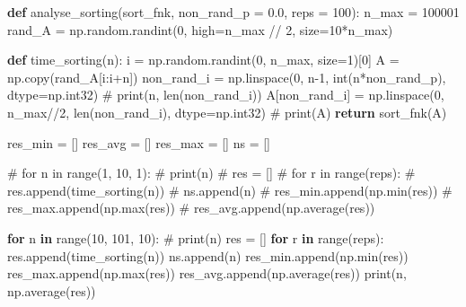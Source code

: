 \documentclass[
  letterpaper,
  DIV=11,
  numbers=noendperiod]{scrreprt}
\newenvironment{Shaded}{\begin{snugshade}}{\end{snugshade}}
\newcommand{\BuiltInTok}[1]{\textcolor[rgb]{0.00,0.23,0.31}{#1}}
\newcommand{\CommentTok}[1]{\textcolor[rgb]{0.37,0.37,0.37}{#1}}
\newcommand{\ControlFlowTok}[1]{\textcolor[rgb]{0.00,0.23,0.31}{\textbf{#1}}}
\newcommand{\DecValTok}[1]{\textcolor[rgb]{0.68,0.00,0.00}{#1}}
\newcommand{\FloatTok}[1]{\textcolor[rgb]{0.68,0.00,0.00}{#1}}
\newcommand{\KeywordTok}[1]{\textcolor[rgb]{0.00,0.23,0.31}{\textbf{#1}}}
\newcommand{\NormalTok}[1]{\textcolor[rgb]{0.00,0.23,0.31}{#1}}
\newcommand{\OperatorTok}[1]{\textcolor[rgb]{0.37,0.37,0.37}{#1}}
\begin{document}
\begin{Shaded}
\begin{Highlighting}[]
\KeywordTok{def}\NormalTok{ analyse\_sorting(sort\_fnk, non\_rand\_p }\OperatorTok{=} \FloatTok{0.0}\NormalTok{, reps }\OperatorTok{=} \DecValTok{100}\NormalTok{):}
\NormalTok{    n\_max }\OperatorTok{=} \DecValTok{100001}
\NormalTok{    rand\_A }\OperatorTok{=}\NormalTok{ np.random.randint(}\DecValTok{0}\NormalTok{, high}\OperatorTok{=}\NormalTok{n\_max }\OperatorTok{//} \DecValTok{2}\NormalTok{, size}\OperatorTok{=}\DecValTok{10}\OperatorTok{*}\NormalTok{n\_max)}

    \KeywordTok{def}\NormalTok{ time\_sorting(n):}
\NormalTok{        i }\OperatorTok{=}\NormalTok{ np.random.randint(}\DecValTok{0}\NormalTok{, n\_max, size}\OperatorTok{=}\DecValTok{1}\NormalTok{)[}\DecValTok{0}\NormalTok{]}
\NormalTok{        A }\OperatorTok{=}\NormalTok{ np.copy(rand\_A[i:i}\OperatorTok{+}\NormalTok{n])}
\NormalTok{        non\_rand\_i }\OperatorTok{=}\NormalTok{ np.linspace(}\DecValTok{0}\NormalTok{, n}\OperatorTok{{-}}\DecValTok{1}\NormalTok{, }\BuiltInTok{int}\NormalTok{(n}\OperatorTok{*}\NormalTok{non\_rand\_p), dtype}\OperatorTok{=}\NormalTok{np.int32)}
\CommentTok{\#         print(n, len(non\_rand\_i))}
\NormalTok{        A[non\_rand\_i] }\OperatorTok{=}\NormalTok{ np.linspace(}\DecValTok{0}\NormalTok{, n\_max}\OperatorTok{//}\DecValTok{2}\NormalTok{, }\BuiltInTok{len}\NormalTok{(non\_rand\_i), dtype}\OperatorTok{=}\NormalTok{np.int32)}
\CommentTok{\#         print(A)}
        \ControlFlowTok{return}\NormalTok{ sort\_fnk(A)}

\NormalTok{    res\_min }\OperatorTok{=}\NormalTok{ []}
\NormalTok{    res\_avg }\OperatorTok{=}\NormalTok{ []}
\NormalTok{    res\_max }\OperatorTok{=}\NormalTok{ []}
\NormalTok{    ns }\OperatorTok{=}\NormalTok{ []}

\CommentTok{\# for n in range(1, 10, 1):}
\CommentTok{\#     print(n)}
\CommentTok{\#     res = []}
\CommentTok{\#     for r in range(reps):}
\CommentTok{\#         res.append(time\_sorting(n))}
\CommentTok{\#     ns.append(n)}
\CommentTok{\#     res\_min.append(np.min(res))}
\CommentTok{\#     res\_max.append(np.max(res))}
\CommentTok{\#     res\_avg.append(np.average(res))}

    \ControlFlowTok{for}\NormalTok{ n }\KeywordTok{in} \BuiltInTok{range}\NormalTok{(}\DecValTok{10}\NormalTok{, }\DecValTok{101}\NormalTok{, }\DecValTok{10}\NormalTok{):}
\CommentTok{\#         print(n)}
\NormalTok{        res }\OperatorTok{=}\NormalTok{ []}
        \ControlFlowTok{for}\NormalTok{ r }\KeywordTok{in} \BuiltInTok{range}\NormalTok{(reps):}
\NormalTok{            res.append(time\_sorting(n))}
\NormalTok{        ns.append(n)}
\NormalTok{        res\_min.append(np.}\BuiltInTok{min}\NormalTok{(res))}
\NormalTok{        res\_max.append(np.}\BuiltInTok{max}\NormalTok{(res))}
\NormalTok{        res\_avg.append(np.average(res))}
        \BuiltInTok{print}\NormalTok{(n, np.average(res))}


\end{Highlighting}
\end{Shaded}
\end{document}
